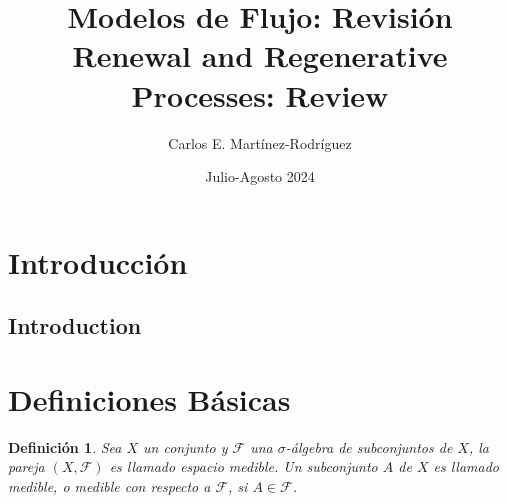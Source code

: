 \documentclass{article}
\title{Modelos de Flujo: Revisión\\
\small{Renewal and Regenerative Processes: Review}}
\author{Carlos E. Martínez-Rodríguez}
\date{Julio-Agosto 2024}
\newtheorem{Def}{Definición}[section]
\renewcommand{\abstractname}{Resumen}
\numberwithin{equation}{section}
\begin{document}
\maketitle

\begin{abstract}
\end{abstract}

\begin{otherlanguage}{english}
\renewcommand{\abstractname}{Abstract} %
\begin{abstract}
\end{abstract}
\end{otherlanguage}
\tableofcontents
\section*{Introducción}
\begin{otherlanguage}{english}
\section*{Introduction}
\end{otherlanguage}
\section{Definiciones  B\'asicas}
\begin{Def}
Sea $X$ un conjunto y $\mathcal{F}$ una $\sigma$-\'algebra de subconjuntos de $X$, la pareja $\left(X,\mathcal{F}\right)$ es llamado espacio medible. Un subconjunto $A$ de $X$ es llamado medible, o medible con respecto a $\mathcal{F}$, si $A\in\mathcal{F}$.
\end{Def}
\end{document}
